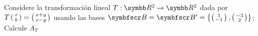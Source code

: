 \item Considere la transformación lineal \(T: \realR^2 \rightarrow \realR^2\) dada por 
    \(T\fsmvec{x,y} = \fsmvec{x+y,x-y}\) usando las bases \(\fb = \fb' = \fset{\fsmvec{1,-1}, \fsmvec{-3,2}}\); Calcule \(A_{T}\)
